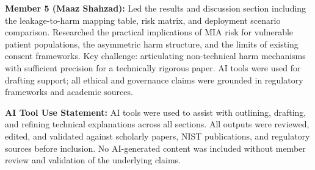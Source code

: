 \documentclass[conference]{IEEEtran}
\begin{document}
	\textbf{Member 5 (Maaz Shahzad):} Led the results and discussion section including the leakage-to-harm mapping table, risk matrix, and deployment scenario comparison. Researched the practical implications of MIA risk for vulnerable patient populations, the asymmetric harm structure, and the limits of existing consent frameworks. Key challenge: articulating non-technical harm mechanisms with sufficient precision for a technically rigorous paper. AI tools were used for drafting support; all ethical and governance claims were grounded in regulatory frameworks and academic sources.

	\textbf{AI Tool Use Statement:} AI tools were used to assist with outlining, drafting, and refining technical explanations across all sections. All outputs were reviewed, edited, and validated against scholarly papers, NIST publications, and regulatory sources before inclusion. No AI-generated content was included without member review and validation of the underlying claims.
\end{document}
